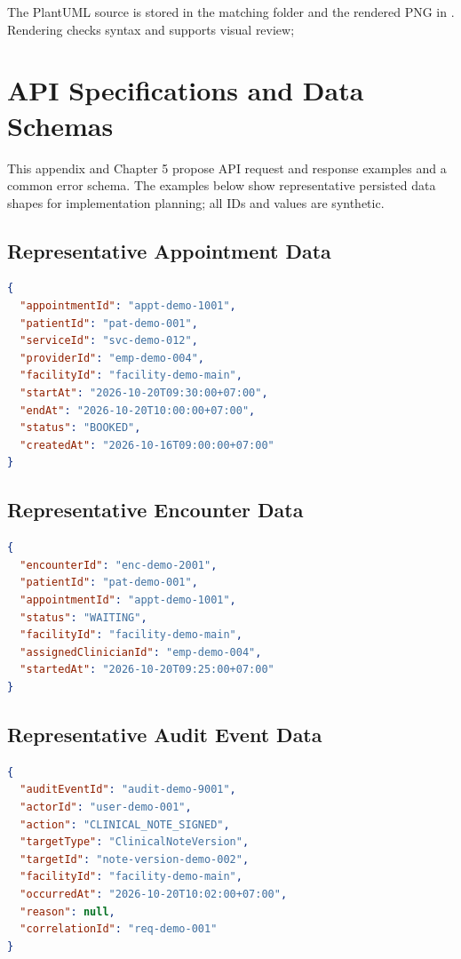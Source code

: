 The PlantUML source is stored in the matching  folder and the rendered PNG in . Rendering checks syntax and supports visual review; 

\section{API Specifications and Data Schemas}
This appendix and Chapter 5 propose API request and response examples and a common error schema. The examples below show representative persisted data shapes for implementation planning; all IDs and values are synthetic.

\subsection{Representative Appointment Data}
\begin{lstlisting}[language=json,caption={Proposed Appointment resource shape},label={lst:appointment-resource}]
{
  "appointmentId": "appt-demo-1001",
  "patientId": "pat-demo-001",
  "serviceId": "svc-demo-012",
  "providerId": "emp-demo-004",
  "facilityId": "facility-demo-main",
  "startAt": "2026-10-20T09:30:00+07:00",
  "endAt": "2026-10-20T10:00:00+07:00",
  "status": "BOOKED",
  "createdAt": "2026-10-16T09:00:00+07:00"
}
\end{lstlisting}

\subsection{Representative Encounter Data}
\begin{lstlisting}[language=json,caption={Proposed Encounter resource shape},label={lst:encounter-resource}]
{
  "encounterId": "enc-demo-2001",
  "patientId": "pat-demo-001",
  "appointmentId": "appt-demo-1001",
  "status": "WAITING",
  "facilityId": "facility-demo-main",
  "assignedClinicianId": "emp-demo-004",
  "startedAt": "2026-10-20T09:25:00+07:00"
}
\end{lstlisting}

\subsection{Representative Audit Event Data}
\begin{lstlisting}[language=json,caption={Proposed audit event shape with no clinical payload duplication},label={lst:audit-event-resource}]
{
  "auditEventId": "audit-demo-9001",
  "actorId": "user-demo-001",
  "action": "CLINICAL_NOTE_SIGNED",
  "targetType": "ClinicalNoteVersion",
  "targetId": "note-version-demo-002",
  "facilityId": "facility-demo-main",
  "occurredAt": "2026-10-20T10:02:00+07:00",
  "reason": null,
  "correlationId": "req-demo-001"
}
\end{lstlisting}

